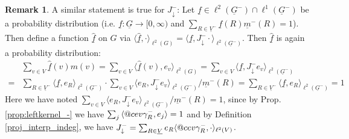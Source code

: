 \documentclass[reqno,12pt,letterpaper]{amsart}
\makeatletter
\numberwithin{equation}{section}
\DeclareRobustCommand{\cev}[1]{%
	\mathpalette\do@cev{#1}%
}
\newcommand{\do@cev}[2]{%
	\fix@cev{#1}{+}%
	\reflectbox{$\m@th#1\vec{\reflectbox{$\fix@cev{#1}{-}\m@th#1#2\fix@cev{#1}{+}$}}$}%
	\fix@cev{#1}{-}%
}
\newcommand{\fix@cev}[2]{%
	\ifx#1\displaystyle
	\mkern#23mu
	\else
	\ifx#1\textstyle
	\mkern#23mu
	\else
	\ifx#1\scriptstyle
	\mkern#22mu
	\else
	\mkern#22mu
	\fi
	\fi
	\fi
}
\newcommand{\1}{\mathds{1}}
\theoremstyle{definition}
\newtheorem{Rem}[Th]{Remark}
\makeatother
\begin{document}
\begin{Rem}
\medskip A similar statement is true for $J^-_\downarrow$: Let $\underline{f} \in \ell^2(\underline{G}^-)\cap \ell^1(\underline{G}^-) $ be a probability distribution (i.e. $\underline{f}: \underline{G} \rightarrow [0, \infty)$ and $\sum_{R \in \underline{V}^-} \underline{f}(R) \underline{m}^-(R)  = 1$). Then define a function $\hat{\underline{f}}$ on $G$ via 
$\langle \hat{\underline{f}} , \cdot \rangle_{\ell^2(G)}  
=   \langle \underline{f}, J^-_\downarrow   \cdot \rangle_{\ell^2(\underline{G}^-)} $. Then $\hat{\underline{f}}$ is again a probability distribution:
\begin{align}
&\sum_{v \in V}	\hat{\underline{f}}(v) m(v) = \sum_{v \in V}	\langle \hat{\underline{f}}(v), e_v \rangle_{\ell^2(G)} 
= 
\sum_{v \in V} \langle \underline{f}, J^-_\downarrow   e_v \rangle_{\ell^2(\underline{G}^-)}\\
 =
&\sum_{R \in \underline{V}^-} 
 \langle \underline{f}, e_R \rangle_{\ell^2(\underline{G}^-)}
 \cdot 
 \sum_{v \in V} 
\langle e_R, J^-_\downarrow   e_v \rangle_{\ell^2(\underline{G}^-)}/\underline{m}^-(R) 
= \sum_{R \in \underline{V}^-} 
\langle \underline{f}, e_R \rangle_{\ell^2(\underline{G}^-)} = 1
\end{align}
Here we have noted $ \sum_{v \in V} 
\langle e_R, J^-_\downarrow   e_v \rangle_{\ell^2(\underline{G}^-)}/\underline{m}^-(R) = 1$, since by Prop. \ref{prop:leftkernel_-} we have $\sum_{j}\, \langle \cev \gamma^{-}_{R}, e_j \rangle =1 $ and by Definition \ref{proj_interp_indeg}, we have $J^-_\downarrow  = \sum_{R \in \underline{V}} e_R \langle \cev\gamma^{-}_{R} , \cdot \rangle_{\ell^2(V)}$.
\end{Rem}
	
\end{document}
